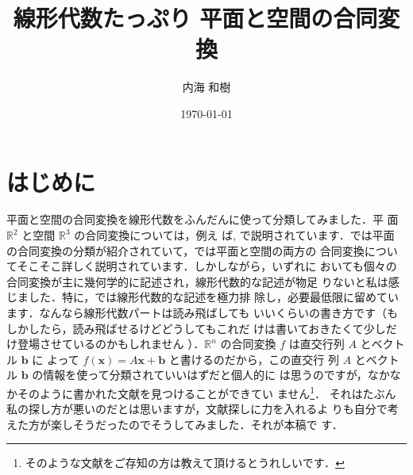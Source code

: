 \documentclass[11pt, uplatex, dvipdfmx, titlepage]{jsarticle}
\theoremstyle{definition}
\begin{document}
\title{線形代数たっぷり 平面と空間の合同変換}
\author{内海 和樹}
\date{\today}
\maketitle
  


\section*{はじめに}


平面と空間の合同変換を線形代数をふんだんに使って分類してみました．平
面 $\mathbb{R}^2$ と空間 $\mathbb{R}^3$ の合同変換については，例え
ば\cite{Kawasaki}, \cite{Kouno}で説明されています．\cite{Kouno}では平面
の合同変換の分類が紹介されていて，\cite{Kawasaki}では平面と空間の両方の
合同変換についてそこそこ詳しく説明されています．しかしながら，いずれに
おいても個々の合同変換が主に幾何学的に記述され，線形代数的な記述が物足
りないと私は感じました．特に，\cite{Kouno}では線形代数的な記述を極力排
除し，必要最低限に留めています．なんなら線形代数パートは読み飛ばしても
いいくらいの書き方です（もしかしたら，読み飛ばせるけどどうしてもこれだ
けは書いておきたくて少しだけ登場させているのかもしれません
）．$\mathbb{R}^n$ の合同変換 $f$ は直交行列 $A$ とベクトル $\bm{b}$ に
よって $f(\bm{x}) = A\bm{x} + \bm{b}$ と書けるのだから，この直交行
列 $A$ とベクトル $\bm{b}$ の情報を使って分類されていいはずだと個人的に
は思うのですが，なかなかそのように書かれた文献を見つけることができてい
ません\footnote{そのような文献をご存知の方は教えて頂けるとうれしいです．}．
それはたぶん私の探し方が悪いのだとは思いますが，文献探しに力を入れるよ
りも自分で考えた方が楽しそうだったのでそうしてみました．それが本稿で
す．
\end{document}
